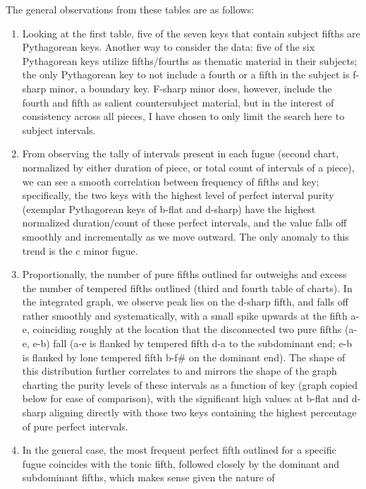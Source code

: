     The general observations from these tables are as follows:

\begin{enumerate}
\def\labelenumi{\arabic{enumi}.}
\tightlist
\item
  Looking at the first table, five of the seven keys that contain
  subject fifths are Pythagorean keys. Another way to consider the data:
  five of the six Pythagorean keys utilize fifths/fourths as thematic
  material in their subjects; the only Pythagorean key to not include a
  fourth or a fifth in the subject is f-sharp minor, a boundary key.
  F-sharp minor does, however, include the fourth and fifth as salient
  countersubject material, but in the interest of consistency across all
  pieces, I have chosen to only limit the search here to subject
  intervals.
\item
  From observing the tally of intervals present in each fugue (second
  chart, normalized by either duration of piece, or total count of
  intervals of a piece), we can see a smooth correlation between
  frequency of fifths and key; specifically, the two keys with the
  highest level of perfect interval purity (exemplar Pythagorean keys of
  b-flat and d-sharp) have the highest normalized duration/count of
  these perfect intervals, and the value falls off smoothly and
  incrementally as we move outward. The only anomaly to this trend is
  the c minor fugue.
\item
  Proportionally, the number of pure fifths outlined far outweighs and
  excess the number of tempered fifths outlined (third and fourth table
  of charts). In the integrated graph, we observe peak lies on the
  d-sharp fifth, and falls off rather smoothly and systematically, with
  a small spike upwards at the fifth a-e, coinciding roughly at the
  location that the disconnected two pure fifths (a-e, e-b) fall (a-e is
  flanked by tempered fifth d-a to the subdominant end; e-b is flanked
  by lone tempered fifth b-f\# on the dominant end). The shape of this
  distribution further correlates to and mirrors the shape of the graph
  charting the purity levels of these intervals as a function of key
  (graph copied below for ease of comparison), with the significant high
  values at b-flat and d-sharp aligning directly with those two keys
  containing the highest percentage of pure perfect intervals.
\item
  In the general case, the most frequent perfect fifth outlined for a
  specific fugue coincides with the tonic fifth, followed closely by the
  dominant and subdominant fifths, which makes sense given the nature of

\end{enumerate}

